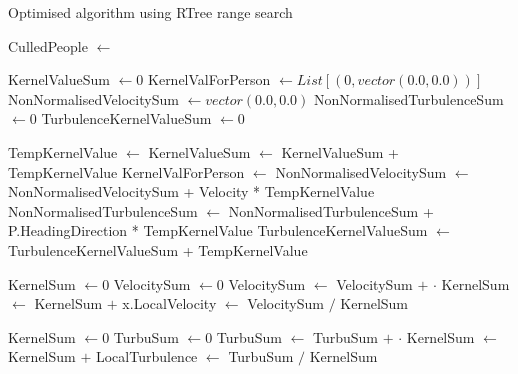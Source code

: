 
\begin{algorithm}
\caption{Optimised algorithm using RTree range search}\label{alg:revised_algorithm}

\begin{algorithmic}[1]

    \State CulledPeople $\gets$  
    \State {}
\EndFor
\EndFunction



\State KernelValueSum $\gets 0$
\State KernelValForPerson $\gets List[(0,vector(0.0,0.0))]$ 
\State NonNormalisedVelocitySum $\gets vector(0.0,0.0)$
\State NonNormalisedTurbulenceSum $\gets 0$
\State TurbulenceKernelValueSum $\gets 0$ 


    \State TempKernelValue $\gets$ 
    \State KernelValueSum $\gets$ KernelValueSum + TempKernelValue
    \State KernelValForPerson $\gets$ 
    \State NonNormalisedVelocitySum $\gets$ NonNormalisedVelocitySum + Velocity * TempKernelValue
        \State NonNormalisedTurbulenceSum $\gets$ NonNormalisedTurbulenceSum + P.HeadingDirection * TempKernelValue
        \State TurbulenceKernelValueSum $\gets$ TurbulenceKernelValueSum + TempKernelValue
    \EndIf
\EndFor


    \State KernelSum $\gets 0$
    \State VelocitySum $\gets 0$
        \State VelocitySum $\gets$ VelocitySum $+$  $\cdot$ 
        \State KernelSum $\gets$ KernelSum $+$ 
    \EndFor
    \State x.LocalVelocity $\gets$ VelocitySum $/$ KernelSum
\EndFor

    \State KernelSum $\gets 0$
    \State TurbuSum $\gets 0$
        \State TurbuSum $\gets$ TurbuSum $+$  $\cdot$ 
        \State KernelSum $\gets$ KernelSum $+$ 
    \EndFor
    \State LocalTurbulence $\gets$ TurbuSum $/$ KernelSum
\EndFor


\end{algorithmic}
\end{algorithm}
